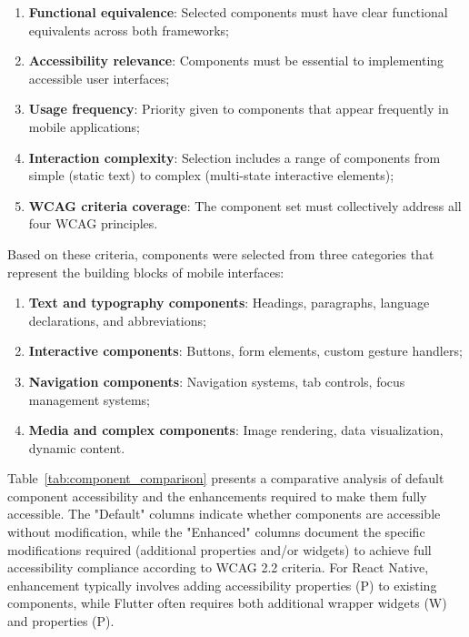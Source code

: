 \begin{enumerate}
    \item \textbf{Functional equivalence}: Selected components must have clear functional equivalents across both frameworks;
    
    \item \textbf{Accessibility relevance}: Components must be essential to implementing accessible user interfaces;
    
    \item \textbf{Usage frequency}: Priority given to components that appear frequently in mobile applications;
    
    \item \textbf{Interaction complexity}: Selection includes a range of components from simple (static text) to complex (multi-state interactive elements);
    
    \item \textbf{WCAG criteria coverage}: The component set must collectively address all four WCAG principles.
\end{enumerate}

Based on these criteria, components were selected from three categories that represent the building blocks of mobile interfaces:

\begin{enumerate}
    \item \textbf{Text and typography components}: Headings, paragraphs, language declarations, and abbreviations;
    
    \item \textbf{Interactive components}: Buttons, form elements, custom gesture handlers;
    
    \item \textbf{Navigation components}: Navigation systems, tab controls, focus management systems;
    
    \item \textbf{Media and complex components}: Image rendering, data visualization, dynamic content.
\end{enumerate}

\pagebreak

Table~\ref{tab:component_comparison} presents a comparative analysis of default component accessibility and the enhancements required to make them fully accessible. The "Default" columns indicate whether components are accessible without modification, while the "Enhanced" columns document the specific modifications required (additional properties and/or widgets) to achieve full accessibility compliance according to WCAG 2.2 criteria. For React Native, enhancement typically involves adding accessibility properties (P) to existing components, while Flutter often requires both additional wrapper widgets (W) and properties (P).

